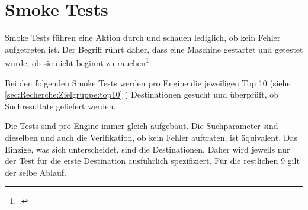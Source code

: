 



\section{Smoke Tests}
\label{sec:konzept:smoketests}
Smoke Tests führen eine Aktion durch und schauen lediglich, ob kein Fehler aufgetreten ist. Der Begriff rührt daher, dass eine Maschine gestartet und getestet wurde, ob sie nicht beginnt zu rauchen\footcite{Smoke_testing_software_-_Wikipedia_the_free_encyclopedia_2015-08-01}.

Bei den folgenden Smoke Tests werden pro Engine die jeweiligen Top 10 (siehe \cref{sec:Recherche:Zielgruppe:top10} ) Destinationen gesucht und überprüft, ob Suchresultate geliefert werden.

Die Tests sind pro Engine immer gleich aufgebaut. Die Suchparameter sind dieselben und auch die Verifikation, ob kein Fehler auftraten, ist äquivalent. Das Einzige, was sich unterscheidet, sind die Destinationen. Daher wird jeweils nur der Test für die erste Destination ausführlich spezifiziert. Für die restlichen 9 gilt der selbe Ablauf.







